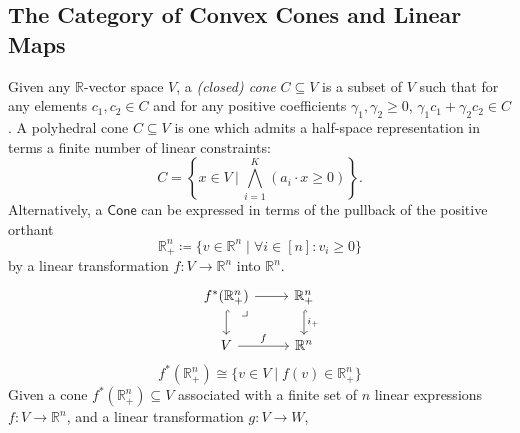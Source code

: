 \documentclass[12pt]{article}
\theoremstyle{definition}
\theoremstyle{remark}
\newcommand{\cone}{\mathsf{Cone}} %
\newcommand{\drpb}[1]{\ar[dr, phantom, "\lrcorner", very near start, #1]}
\begin{document}
\subsection{The Category of Convex Cones and Linear Maps}

Given any $\mathbb{R}$-vector space $V$, a \textit{(closed) cone} $C \subseteq V$ is a subset of $V$ such that for any elements $c_1, c_2 \in C$ and for any positive coefficients $\gamma_1, \gamma_2 \geq 0$, $\gamma_1 c_1 + \gamma_2 c_2 \in C$. A polyhedral cone $C \subseteq V$ is one which admits a half-space representation in terms a finite number of linear constraints:
\begin{equation}
    C = \left\{ x \in V \: \bigg| \: \bigwedge_{i=1}^{K} (a_i \cdot x \geq 0) \right\}.
\end{equation}
Alternatively, a $\cone$ can be expressed in terms of the pullback of the positive orthant
\begin{equation}
    \mathbb{R}_{+}^{n} \coloneqq \{v \in \mathbb{R}^n \mid \forall i \in [n]: v_i \geq 0 \}
\end{equation}
by a linear transformation $f : V \to \mathbb{R}^{n}$ into $\mathbb{R}^{n}$.
\begin{equation}
    \begin{tikzcd}
        f^{*}(\mathbb{R}^n_+) \drpb{xshift=-2mm} \ar[r] \ar[d, hook] &  \mathbb{R}^n_+ \ar[d, hook, "i_+"] \\
        V \ar[r, "f"] & \mathbb{R}^n
    \end{tikzcd}
\end{equation}
\begin{equation}
    f^{*}(\mathbb{R}^n_+) \cong \{ v \in V \mid f(v) \in \mathbb{R}^n_+ \}
\end{equation}
Given a cone $f^{*}(\mathbb{R}^n_+) \subseteq V$ associated with a finite set of $n$ linear expressions $f : V \to \mathbb{R}^n$, and a linear transformation $g : V \to W$,
\end{document}
